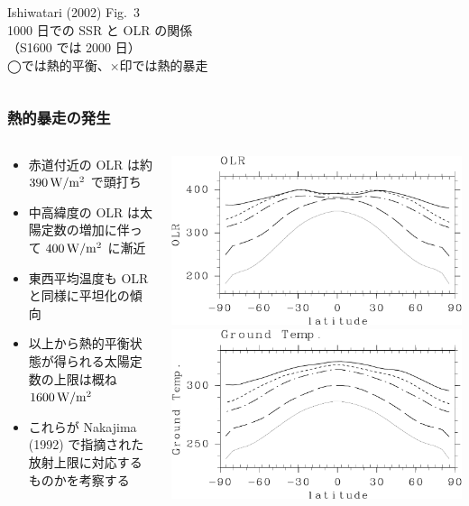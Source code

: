 \documentclass[aspectratio=149,9pt,]{beamer}
\begin{document}
\begin{frame}
\begin{columns}[T,onlytextwidth]
\begin{column}{.3\textwidth}
			Ishiwatari \etal (2002) Fig.~3\\
			1000 日での SSR と OLR の関係\\
			（S1600 では 2000 日）\\
			◯では熱的平衡、×印では熱的暴走
		\end{column}
	\end{columns}
\end{frame}

\begin{frame}
	\frametitle{熱的暴走の発生}
	\begin{columns}[T,onlytextwidth]
		\begin{column}{.55\textwidth}
			\begin{itemize}
				\item 赤道付近の OLR は約 \(390\hmu{W/m^2}\) で頭打ち
				\item 中高緯度の OLR は太陽定数の増加に伴って \(400\hmu{W/m^2}\) に漸近
				\item 東西平均温度も OLR と同様に平坦化の傾向
				\item 以上から熱的平衡状態が得られる太陽定数の上限は概ね \(1600\hmu{W/m^2}\)
				\item これらが Nakajima \etal (1992) で指摘された放射上限に対応するものかを考察する
			\end{itemize}
		\end{column}
		\begin{column}{.4\textwidth}
			\centering
			\includegraphics[width=\textwidth]{./fig/OLR-meris.kps-crop.pdf}\\
			\includegraphics[width=\textwidth]{./fig/Tg-meris.kps-crop.pdf}\\

\end{column}
\end{columns}
\end{frame}
\end{document}
